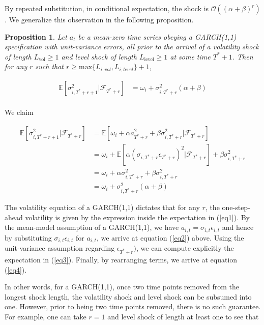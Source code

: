 \documentclass[11pt]{article}
\newtheorem{prop}{Proposition}
\theoremstyle{definition}
\newenvironment{proof-of-proposition}[1][{}]{\noindent{\bf
    Proof of Proposition {#1}}
  \hspace*{.5em}}{\qed\bigskip\\}
\begin{document}
By repeated substitution, in conditional expectation, the shock is $\mathcal{O}((\alpha+\beta)^{r})$.  We generalize this observation in the following proposition.

\begin{prop}
Let $a_{t}$ be a mean-zero time series obeying a GARCH(1,1) specification with unit-variance errors, all prior to the arrival of a volatility shock of length $L_{\text{vol}} \geq 1$ and level shock of length $L_{\text{level}}\geq 1$ at some time $T^{*}+1$.  Then for any $r$ such that $r \geq \text{max}\{L_{i, vol},L_{i, level}\} + 1$, 

\begin{align}
\mathbb{E}[ \sigma^{2}_{i,T^{*}+r+1} |\mathcal{F}_{T^{*}+r}] & = \omega_{i} + \sigma^{2}_{i,T^{*}+r}(\alpha + \beta) \\
\end{align}
\end{prop}

\begin{proof-of-proposition}
We claim

\begin{align}
\mathbb{E}[ \sigma^{2}_{i,T^{*}+r+1} |\mathcal{F}_{T^{*}+r}] & = \mathbb{E}[\omega_{i} + \alpha a_{T^{*}+r}^{2} + \beta\sigma^{2}_{i,T^{*}+r} |\mathcal{F}_{T^{*}+r}] \label{eq1}\\
& = \omega_{i} + \mathbb{E}[\alpha(\sigma_{i,T^{*}+r}\epsilon_{T^{*}+r})^{2} |\mathcal{F}_{T^{*}+r}] + \beta\sigma^{2}_{i,T^{*}+r} \label{eq2}\\
& = \omega_{i} + \alpha\sigma_{i,T^{*}+r}^{2} + \beta\sigma^{2}_{i,T^{*}+r} \label{eq3}\\
& = \omega_{i} + \sigma^{2}_{i,T^{*}+r}(\alpha + \beta) \label{eq4}
\end{align}

The volatility equation of a GARCH(1,1) dictates that for any $r$, the one-step-ahead volatility is given by the expression inside the expectation in (\ref{eq1}).  By the mean-model assumption of a GARCH(1,1), we have $a_{i,t} = \sigma_{i,t}\epsilon_{i,t}$ and hence by substituting $\sigma_{i,t}\epsilon_{i,t}$ for $a_{i,t}$, we arrive at equation (\ref{eq2}) above.  Using the unit-variance assumption regarding $\epsilon_{T^{*}+r})$, we can compute explicitly the expectation in (\ref{eq3}).  Finally, by rearranging terms, we arrive at equation (\ref{eq4}).
\end{proof-of-proposition}

In other words, for a GARCH(1,1), once two time points removed from the longest shock length, the volatility shock and level shock can be subsumed into one.  However, prior to being two time points removed, there is no such guarantee.  For example, one can take $r = 1$ and level shock of length at least one to see that 
\end{document}
